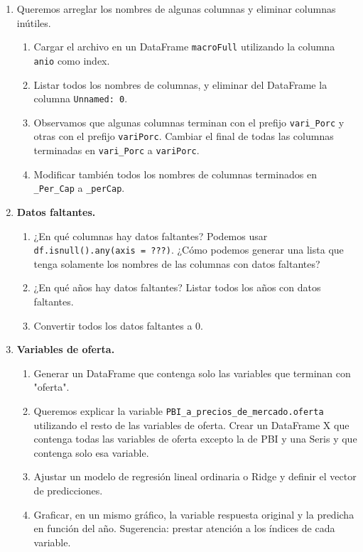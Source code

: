 \documentclass[a4paper,11pt]{article}
\theoremstyle{definition}
\begin{document}
\begin{enumerate}[resume]
\item Queremos arreglar los nombres de algunas columnas y eliminar columnas inútiles.
\begin{enumerate}
\item Cargar el archivo en un DataFrame \lstinline{macroFull} utilizando la columna \lstinline{anio} como index.
\item Listar todos los nombres de columnas, y eliminar del DataFrame la columna \lstinline{Unnamed: 0}.
\item Observamos que algunas columnas terminan con el prefijo \lstinline{vari_Porc} y otras con el prefijo \lstinline{variPorc}. Cambiar el final de todas las columnas terminadas en \lstinline{vari_Porc} a \lstinline{variPorc}.
\item Modificar también todos los nombres de columnas terminados en \lstinline{_Per_Cap} a \lstinline{_perCap}.
\end{enumerate}

\item \textbf{Datos faltantes.} 
\begin{enumerate} 
\item ¿En qué columnas hay datos faltantes? Podemos usar \lstinline{df.isnull().any(axis = ???)}. ¿Cómo podemos generar una lista que tenga solamente los nombres de las columnas con datos faltantes?
\item ¿En qué años hay datos faltantes? Listar todos los años con datos faltantes.
\item Convertir todos los datos faltantes a 0.
\end{enumerate}

\item \textbf{Variables de oferta.}
\begin{enumerate}
\item Generar un DataFrame que contenga solo las variables que terminan con "oferta".
\item Queremos explicar la variable \lstinline{PBI_a_precios_de_mercado.oferta} utilizando el resto de las variables de oferta. Crear un DataFrame X que contenga todas las variables de oferta excepto la de PBI y una Seris y que contenga solo esa variable.
\item Ajustar un modelo de regresión lineal ordinaria o Ridge y definir el vector de predicciones.
\item Graficar, en un mismo gráfico, la variable respuesta original y la predicha en función del año. Sugerencia: prestar atención a los índices de cada variable.
\end{enumerate}

\end{enumerate}
\end{document}
